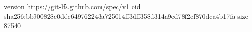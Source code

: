 version https://git-lfs.github.com/spec/v1
oid sha256:bb900828c0ddc649762243a725014ff3dff358d314a9ed78f2cf870dca4b17fa
size 87540
